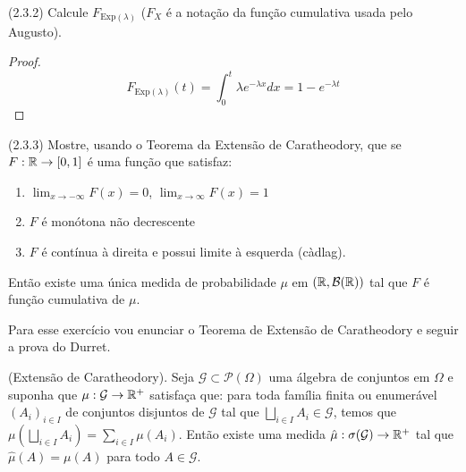 \begin{exercise}
	(2.3.2)
	Calcule $F_{\text{Exp}(\lambda)}$ ($F_X$ é a notação da função
	cumulativa usada pelo Augusto).
\end{exercise}
\begin{proof}
	\[
		F_{\text{Exp}(\lambda)}(t) = \int_{0}^{t} \lambda e^{-\lambda x} dx
		= 1 - e^{-\lambda t}
	\]
\end{proof}

\begin{exercise}
	(2.3.3)
	Mostre, usando o Teorema da Extensão de Caratheodory, que se $F:\mathbb{R} \rightarrow [0,1]$ é
	uma função que satisfaz:
	\begin{enumerate}[label=(\roman*)]
		\item $\lim_{x\to -\infty} F(x) = 0$, $\lim_{x\to \infty} F(x) = 1$
		\item $F$ é monótona não decrescente
		\item $F$ é contínua à direita e possui limite à esquerda (càdlag).
	\end{enumerate}

	Então existe uma única medida de probabilidade $\mu$ em $(\mathbb{R},
	\mathcal{B}(\mathbb{R}))$ tal que $F$ é função cumulativa de $\mu$.
\end{exercise}

Para esse exercício vou enunciar o Teorema de Extensão de Caratheodory e
seguir a prova do Durret.
\begin{theorem}
	\label{trm:caratheodory_extension}
	(Extensão de Caratheodory). Seja $\mathcal{G} \subset
	\mathcal{P}(\Omega)$ uma álgebra
	de conjuntos em $\Omega$ e suponha que $\mu : \mathcal{G} \rightarrow \mathbb{R}^+$
	satisfaça que:
	para toda família finita ou enumerável $(A_i)_{i \in I}$ de
	conjuntos disjuntos de $\mathcal{G}$
	tal que $\bigsqcup_{i \in I} A_i \in \mathcal{G}$,
	temos que $\mu(\bigsqcup_{i \in I} A_i) = \sum_{i \in I} \mu(A_i)$.
	Então existe uma medida $\hat{\mu} : \sigma(\mathcal{G}) \rightarrow \mathbb{R}^+$
	tal que $\hat{\mu}(A) = \mu(A)$ para todo $A \in \mathcal{G}$.

\end{theorem}

